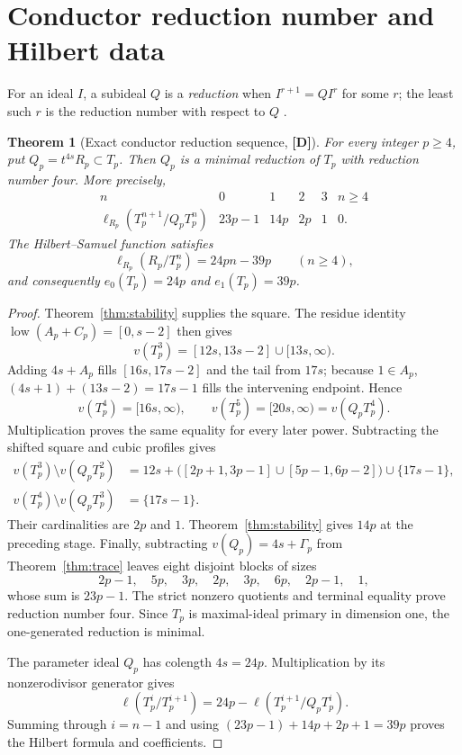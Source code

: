 \documentclass[11pt]{article}
\newtheorem{theorem}{Theorem}[section]
\theoremstyle{definition}
\theoremstyle{remark}
\begin{document}
\section{\texorpdfstring{\enspace}{}Conductor reduction number and Hilbert data}

For an ideal $I$, a subideal $Q$ is a \emph{reduction} when $I^{r+1}=QI^r$ for some $r$;
the least such $r$ is the reduction number with respect to $Q$ \cite{NorthcottRees1954}.

\begin{theorem}[Exact conductor reduction sequence, {\bf[D]}]\label{thm:reduction}
For every integer $p\ge4$, put $Q_p=t^{4s}R_p\subset T_p$. Then $Q_p$ is a minimal reduction of
$T_p$ with reduction number four. More precisely,
\[
\begin{array}{c|ccccc}
n&0&1&2&3&n\ge4\\ \hline
\ell_{R_p}(T_p^{n+1}/Q_pT_p^n)&23p-1&14p&2p&1&0.
\end{array}
\]
The Hilbert--Samuel function satisfies
\[
\ell_{R_p}(R_p/T_p^n)=24pn-39p\qquad(n\ge4),
\]
and consequently $e_0(T_p)=24p$ and $e_1(T_p)=39p$.
\end{theorem}

\begin{proof}
Theorem~\ref{thm:stability} supplies the square. The residue identity
$\operatorname{low}(A_p+C_p)=[0,s-2]$ then gives
\[
v(T_p^3)=[12s,13s-2]\cup[13s,\infty).
\]
Adding $4s+A_p$ fills $[16s,17s-2]$ and the tail from $17s$; because $1\in A_p$,
$(4s+1)+(13s-2)=17s-1$ fills the intervening endpoint. Hence
\[
v(T_p^4)=[16s,\infty),\qquad v(T_p^5)=[20s,\infty)=v(Q_pT_p^4).
\]
Multiplication proves the same equality for every later power. Subtracting the shifted square and
cubic profiles gives
\begin{align*}
v(T_p^3)\setminus v(Q_pT_p^2)
 &=12s+\bigl([2p+1,3p-1]\cup[5p-1,6p-2]\bigr)\cup\{17s-1\},\\
v(T_p^4)\setminus v(Q_pT_p^3)&=\{17s-1\}.
\end{align*}
Their cardinalities are $2p$ and $1$. Theorem~\ref{thm:stability} gives $14p$ at the preceding
stage. Finally, subtracting $v(Q_p)=4s+\Gamma_p$ from Theorem~\ref{thm:trace} leaves eight
disjoint blocks of sizes
\[
2p-1,\quad5p,\quad3p,\quad2p,\quad3p,\quad6p,\quad2p-1,\quad1,
\]
whose sum is $23p-1$. The strict nonzero quotients and terminal equality prove reduction number
four. Since $T_p$ is maximal-ideal primary in dimension one, the one-generated reduction is
minimal.

The parameter ideal $Q_p$ has colength $4s=24p$. Multiplication by its nonzerodivisor generator
gives
\[
\ell(T_p^i/T_p^{i+1})=24p-\ell(T_p^{i+1}/Q_pT_p^i).
\]
Summing through $i=n-1$ and using
$(23p-1)+14p+2p+1=39p$ proves the Hilbert formula and coefficients.
\end{proof}
\end{document}
